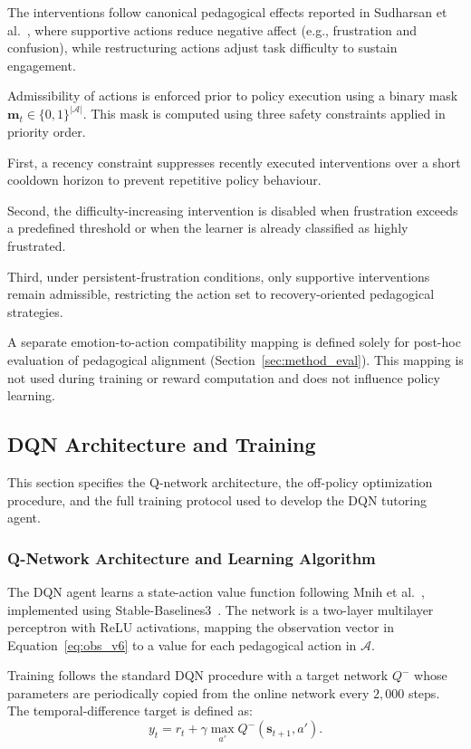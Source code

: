 The interventions follow canonical pedagogical effects reported in Sudharsan et al.~\cite{sudharsan_intervention_2026}, where supportive actions reduce negative affect (e.g., frustration and confusion), while restructuring actions adjust task difficulty to sustain engagement.

Admissibility of actions is enforced prior to policy execution using a binary mask $\mathbf{m}_t \in \{0,1\}^{|\mathcal{A}|}$. This mask is computed using three safety constraints applied in priority order.

First, a recency constraint suppresses recently executed interventions over a short cooldown horizon to prevent repetitive policy behaviour.

Second, the difficulty-increasing intervention is disabled when frustration exceeds a predefined threshold or when the learner is already classified as highly frustrated.

Third, under persistent-frustration conditions, only supportive interventions remain admissible, restricting the action set to recovery-oriented pedagogical strategies.

A separate emotion-to-action compatibility mapping is defined solely for post-hoc evaluation of pedagogical alignment (Section~\ref{sec:method_eval}). This mapping is not used during training or reward computation and does not influence policy learning.
\subsection{\ac{DQN} Architecture and Training}\label{sec:method_rl_dqn_parent}

This section specifies the Q-network architecture, the off-policy optimization procedure, and the full training protocol used to develop the \ac{DQN} tutoring agent.

\subsubsection{Q-Network Architecture and Learning Algorithm}\label{sec:method_ppo}

The \ac{DQN} agent learns a state-action value function following Mnih et al.~\cite{mnih_dqn_2015}, implemented using Stable-Baselines3~\cite{raffin_sb3_2021}. The network is a two-layer multilayer perceptron with ReLU activations, mapping the observation vector in Equation~\eqref{eq:obs_v6} to a value for each pedagogical action in $\mathcal{A}$.

Training follows the standard \ac{DQN} procedure with a target network $Q^-$ whose parameters are periodically copied from the online network every $2{,}000$ steps. The temporal-difference target is defined as:
\begin{equation}
y_t = r_t + \gamma \max_{a'} Q^-(\mathbf{s}_{t+1}, a').
\label{eq:dqn_target}
\end{equation}


